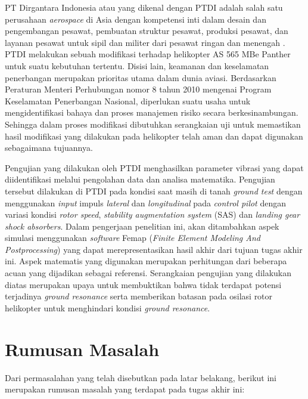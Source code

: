 PT Dirgantara Indonesia atau yang dikenal dengan PTDI adalah salah satu perusahaan \textit{aerospace} di Asia dengan kompetensi inti dalam desain dan pengembangan pesawat, pembuatan struktur pesawat, produksi pesawat, dan layanan pesawat untuk sipil dan militer dari pesawat ringan dan menengah \cite{PTDI}. PTDI melakukan sebuah modifikasi terhadap helikopter AS 565 MBe Panther untuk suatu kebutuhan tertentu. Disisi lain, keamanan dan keselamatan penerbangan merupakan prioritas utama dalam dunia aviasi. Berdasarkan Peraturan Menteri Perhubungan nomor 8 tahun 2010 mengenai Program Keselamatan Penerbangan Nasional, diperlukan suatu usaha untuk mengidentifikasi bahaya dan proses manajemen risiko secara berkesinambungan. Sehingga dalam proses modifikasi dibutuhkan serangkaian uji untuk memastikan hasil modifikasi yang dilakukan pada helikopter telah aman dan dapat digunakan sebagaimana tujuannya.

Pengujian yang dilakukan oleh PTDI menghasilkan parameter vibrasi yang dapat diidentifikasi melalui pengolahan data dan analisa matematika. Pengujian tersebut dilakukan di PTDI pada kondisi saat masih di tanah \textit{ground test} dengan menggunakan \textit{input} impuls \textit{lateral} dan \textit{longitudinal} pada \textit{control pilot} dengan variasi kondisi \textit{rotor speed}, \textit{stability augmentation system} (SAS) dan \textit{landing gear shock absorbers}. Dalam pengerjaan penelitian ini, akan ditambahkan aspek simulasi menggunakan \textit{software} Femap (\textit{Finite Element Modeling And Postprocessing}) yang dapat merepresentasikan hasil akhir dari tujuan tugas akhir ini. Aspek matematis yang digunakan merupakan perhitungan dari beberapa acuan yang dijadikan sebagai referensi. Serangkaian pengujian yang dilakukan diatas merupakan upaya untuk membuktikan bahwa tidak terdapat potensi terjadinya \textit{ground resonance} serta memberikan batasan pada osilasi rotor helikopter untuk menghindari kondisi \textit{ground resonance}.

\section{Rumusan Masalah}
\label{sec:rumusan masalah}

Dari permasalahan yang telah disebutkan pada latar belakang, berikut ini merupakan rumusan masalah yang terdapat pada tugas akhir ini:

